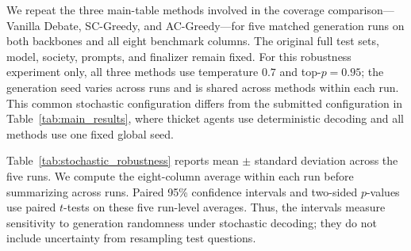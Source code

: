 We repeat the three main-table methods involved in the coverage comparison---
Vanilla Debate, SC-Greedy, and AC-Greedy---for five matched generation runs on
both backbones and all eight benchmark columns. The original full test sets,
model, society, prompts, and finalizer remain fixed. For this robustness
experiment only, all three methods use temperature $0.7$ and top-$p=0.95$; the
generation seed varies across runs and is shared across methods within each
run. This common stochastic configuration differs from the submitted
configuration in Table~\ref{tab:main_results}, where thicket agents use
deterministic decoding and all methods use one fixed global seed.

Table~\ref{tab:stochastic_robustness} reports mean $\pm$ standard deviation
across the five runs. We compute the eight-column average within each run
before summarizing across runs. Paired 95\% confidence intervals and two-sided
$p$-values use paired $t$-tests on these five run-level averages. Thus, the
intervals measure sensitivity to generation randomness under stochastic
decoding; they do not include uncertainty from resampling test questions.

